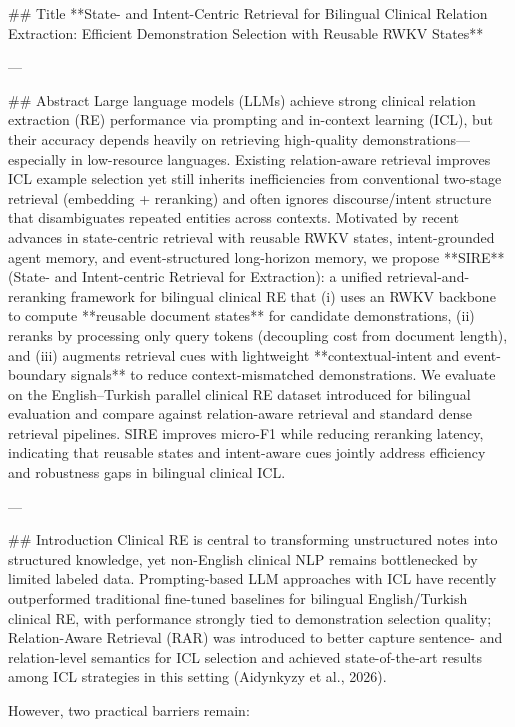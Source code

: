 ## Title  
**State- and Intent-Centric Retrieval for Bilingual Clinical Relation Extraction: Efficient Demonstration Selection with Reusable RWKV States**

---

## Abstract  
Large language models (LLMs) achieve strong clinical relation extraction (RE) performance via prompting and in-context learning (ICL), but their accuracy depends heavily on retrieving high-quality demonstrations—especially in low-resource languages. Existing relation-aware retrieval improves ICL example selection yet still inherits inefficiencies from conventional two-stage retrieval (embedding + reranking) and often ignores discourse/intent structure that disambiguates repeated entities across contexts. Motivated by recent advances in state-centric retrieval with reusable RWKV states, intent-grounded agent memory, and event-structured long-horizon memory, we propose **SIRE** (State- and Intent-centric Retrieval for Extraction): a unified retrieval-and-reranking framework for bilingual clinical RE that (i) uses an RWKV backbone to compute **reusable document states** for candidate demonstrations, (ii) reranks by processing only query tokens (decoupling cost from document length), and (iii) augments retrieval cues with lightweight **contextual-intent and event-boundary signals** to reduce context-mismatched demonstrations. We evaluate on the English–Turkish parallel clinical RE dataset introduced for bilingual evaluation and compare against relation-aware retrieval and standard dense retrieval pipelines. SIRE improves micro-F1 while reducing reranking latency, indicating that reusable states and intent-aware cues jointly address efficiency and robustness gaps in bilingual clinical ICL.

---

## Introduction  
Clinical RE is central to transforming unstructured notes into structured knowledge, yet non-English clinical NLP remains bottlenecked by limited labeled data. Prompting-based LLM approaches with ICL have recently outperformed traditional fine-tuned baselines for bilingual English/Turkish clinical RE, with performance strongly tied to demonstration selection quality; Relation-Aware Retrieval (RAR) was introduced to better capture sentence- and relation-level semantics for ICL selection and achieved state-of-the-art results among ICL strategies in this setting (Aidynkyzy et al., 2026).  

However, two practical barriers remain:

